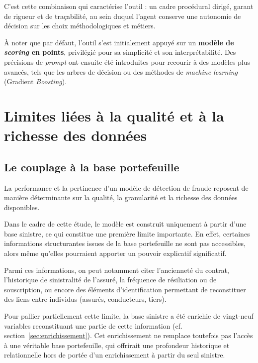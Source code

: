 C'est cette combinaison qui caractérise l'outil : un cadre procédural dirigé, garant de rigueur et de traçabilité, au sein duquel l'agent conserve une autonomie de décision sur les choix méthodologiques et métiers.

À noter que par défaut, l'outil s'est initialement appuyé sur un \textbf{modèle de \textit{scoring} en points}, privilégié pour sa simplicité et son interprétabilité. Des précisions de \textit{prompt} ont ensuite été introduites pour recourir à des modèles plus avancés, tels que les arbres de décision ou des méthodes de \textit{machine learning} (Gradient \textit{Boosting}).

\section{Limites liées à la qualité et à la richesse des données}

\subsection{Le couplage à la base portefeuille}

La performance et la pertinence d'un modèle de détection de fraude reposent de manière déterminante sur la qualité, la granularité et la richesse des données disponibles.

Dans le cadre de cette étude, le modèle est construit uniquement à partir d'une base sinistre, ce qui constitue une première limite importante. En effet, certaines informations structurantes issues de la base portefeuille ne sont pas accessibles, alors même qu'elles pourraient apporter un pouvoir explicatif significatif.

Parmi ces informations, on peut notamment citer l'ancienneté du contrat, l'historique de sinistralité de l'assuré, la fréquence de résiliation ou de souscription, ou encore des éléments d'identification permettant de reconstituer des liens entre individus (assurés, conducteurs, tiers).

Pour pallier partiellement cette limite, la base sinistre a été enrichie de vingt-neuf variables reconstituant une partie de cette information (cf. section~\ref{sec:enrichissement}). Cet enrichissement ne remplace toutefois pas l'accès à une véritable base portefeuille, qui offrirait une profondeur historique et relationnelle hors de portée d'un enrichissement à partir du seul sinistre.

